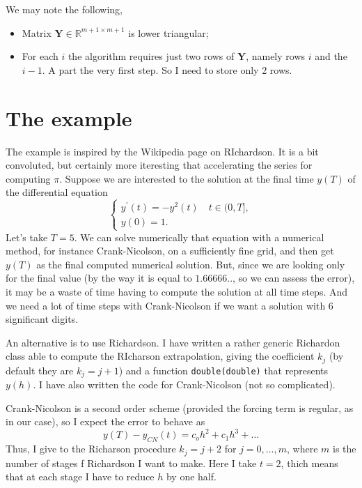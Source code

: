 \documentclass[10pt,a4paper,twoside]{article}
\begin{document}
We may note the following, 
\begin{itemize}
    \item Matrix $\mathbf{Y}\in\mathbb{R}^{m+1\times m+1}$ is lower triangular;
    \item For each $i$ the algorithm requires just two rows of $\mathbf{Y}$, namely rows $i$ and the $i-1$. A part the very first step. So I need to store only 2 rows.
\end{itemize}  
\section{The example}
The example is inspired by the Wikipedia page on RIchardson. It is a bit convoluted, but certainly more iteresting that accelerating the series for computing $\pi$. Suppose we are interested to the solution at the final time
$y(T)$ of the differential equation
\begin{equation}
  \begin{cases}
    y^\prime(t)=-y^2(t)\quad t\in (0,T],\\
    y(0)=1.
  \end{cases}
\end{equation}
Let's take $T=5$. We can solve numerically that equation with a numerical method, for instance Crank-Nicolson, on a sufficiently fine grid, and then get
$y(T)$ as the final computed numerical solution. But, since we are looking only for the final value (by the way it is equal to $1.66666..$, so we can assess the error), it may be a waste of time having to compute the solution at all time steps. And we need a lot of time steps with Crank-Nicolson if we want a solution with 6 significant digits.

An alternative is to use Richardson. I have written a rather generic Richardon class able to compute the RIcharson extrapolation, giving the
coefficient $k_j$ (by default they are $k_j=j+1$) and a function \lstinline!double(double)! that represents $y(h)$. I have also written the code for Crank-Nicolson (not so complicated).

Crank-Nicolson is a second order scheme (provided the forcing term is regular, as in our case), so I expect the error to behave as
\[
  y(T)-y_{CN}(t)= c_oh^2+c_1h^3+\ldots
\]
Thus, I give to the Richarson procedure $k_j=j+2$ for $j=0,\ldots,m$, where $m$ is the number of stages f Richardson I want to make. Here I take $t=2$, thich means that at each stage I have to reduce $h$ by one half. 
\end{document}
